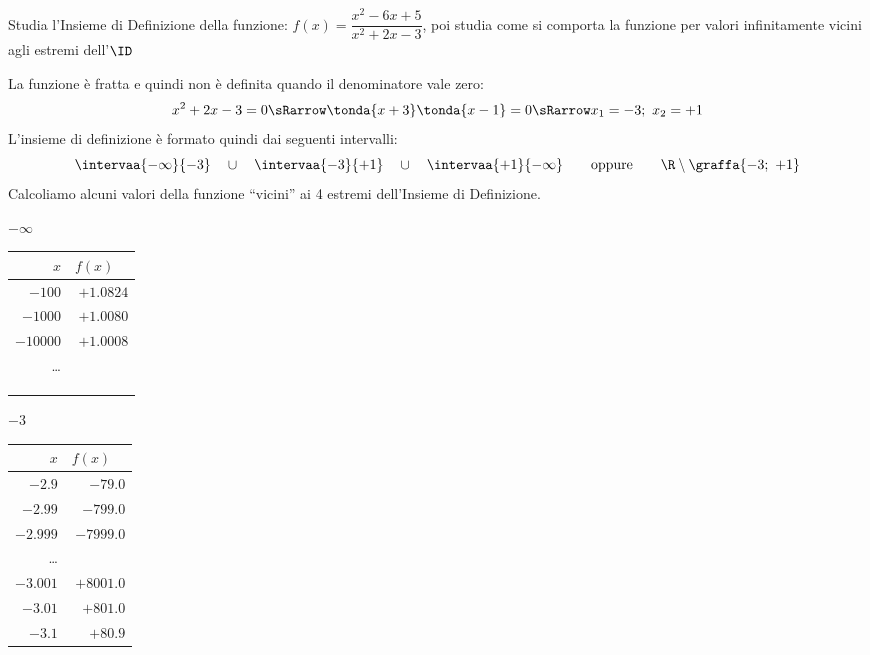 \begin{esempio}
 Studia l'Insieme di Definizione della funzione: 
 \(f(x)=\dfrac{x^2-6x+5}{x^2+2x-3}\),\quad
poi studia come si comporta la funzione per valori infinitamente vicini 
agli estremi dell'\(\ID\)

La funzione è fratta e quindi non è definita quando il denominatore vale 
zero:
\[x^2+2x-3=0 \sRarrow \tonda{x+3}\tonda{x-1}=0 \sRarrow x_1=-3;~x_2=+1\]
L'insieme di definizione è formato quindi dai seguenti intervalli:
\[\intervaa{-\infty}{-3} \quad \cup \quad 
\intervaa{-3}{+1}\quad \cup \quad 
\intervaa{+1}{-\infty} \qquad \text{oppure} \qquad
\R \setminus \graffa{-3;~+1}\]
Calcoliamo alcuni valori della funzione ``vicini'' ai 4 estremi 
dell'Insieme di Definizione.

\begin{minipage}{.24\textwidth}
\begin{center}
\(-\infty\)\\
\begin{tabular}{r|r}
\(x\) & \(f(x)\quad\)\\\hline
\(-100\) & \(+1.0824\) \\
\(-1000\) & \(+1.0080\) \\
\(-10000\) & \(+1.0008\) \\
\dots \\
&\\
&\\
&
\end{tabular}
\end{center}
\end{minipage}
\begin{minipage}{.24\textwidth}
\begin{center}
\(-3\)\\
\begin{tabular}{r|r}
\(x\) & \(f(x)\quad\)\\\hline
\(-2.9\) & \(-79.0\) \\
\(-2.99\) & \(-799.0\) \\
\(-2.999\) & \(-7999.0\) \\
\dots \\
\(-3.001\) & \(+8001.0\) \\
\(-3.01\) & \(+801.0\) \\
\(-3.1\) & \(+80.9\) \\
\end{tabular}
\end{center}
\end{minipage}
\begin{minipage}{.24\textwidth}

\end{minipage}
\end{esempio}
